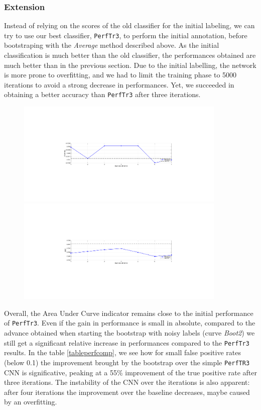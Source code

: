 \documentclass[a4paper]{article}
\begin{document}
	\subsubsection*{Extension}
	Instead of relying on the scores of the old classifier for the initial labeling, we can try to use our best classifier, \texttt{PerfTr3}, to perform the initial annotation, before bootstraping with the \emph{Average} method described above. As the initial classification is much better than the old classifier, the performances obtained are much better than in the previous section. Due to the initial labelling, the network is more prone to overfitting, and we had to limit the training phase to 5000 iterations to avoid a strong decrease in performances.
	 	Yet, we succeeded in obtaining a better accuracy than \texttt{PerfTr3} after three iterations.
	 	 \begin{figure}[H]
                \centering
                \includegraphics[width=10cm]{bootstraphk/acc}
                \includegraphics[width=10cm]{bootstraphk/auc}
                \caption{}
         \end{figure}
         Overall, the Area Under Curve indicator remains close to the initial performance of \texttt{PerfTr3}. Even if the gain in performance is small in absolute, compared to the advance obtained when starting the bootstrap with noisy labels (curve \emph{Boot2}) we still get a significant relative increase in performances compared to the \texttt{PerfTr3} results. In the table \ref{tableperfcomp}, we see how for small false positive rates (below 0.1) the improvement brought by the bootstrap over the simple \texttt{PerfTR3} CNN is significative, peaking at a 55\% improvement of the true positive rate after three iterations. The instability of the CNN over the iterations is also apparent: after four iterations the improvement over the baseline decreases, maybe caused by an overfitting.
\end{document}
